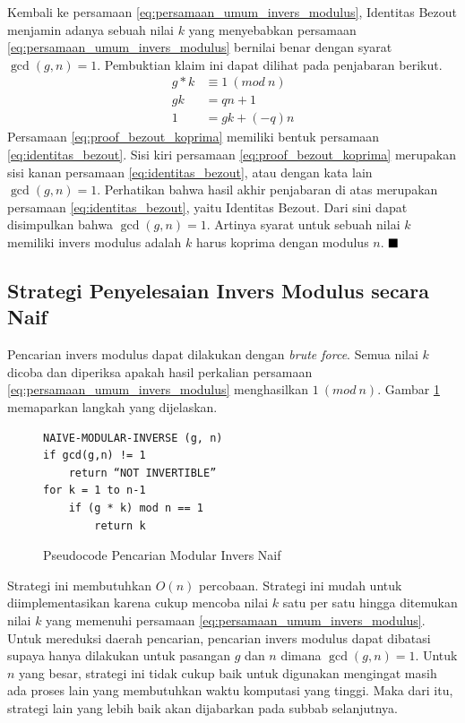 Kembali ke persamaan \eqref{eq:persamaan_umum_invers_modulus}, Identitas Bezout menjamin adanya sebuah nilai $ k $ yang menyebabkan persamaan \eqref{eq:persamaan_umum_invers_modulus} bernilai benar dengan syarat $ \gcd (g,n) = 1 $. Pembuktian klaim ini dapat dilihat pada penjabaran berikut.
\begin{align}
g*k &\equiv 1\ (mod\ n) \\
gk &= qn+1 \\
1 &= gk + (-q)n
\label{eq:proof_bezout_koprima}
\end{align}
Persamaan \eqref{eq:proof_bezout_koprima} memiliki bentuk persamaan \eqref{eq:identitas_bezout}. Sisi kiri persamaan \eqref{eq:proof_bezout_koprima} merupakan sisi kanan persamaan \eqref{eq:identitas_bezout}, atau dengan kata lain $ \gcd (g, n) = 1 $. Perhatikan bahwa hasil akhir penjabaran di atas merupakan persamaan \eqref{eq:identitas_bezout}, yaitu Identitas Bezout. Dari sini dapat disimpulkan bahwa $ \gcd (g, n)=1 $. Artinya syarat untuk sebuah nilai $ k $ memiliki invers modulus adalah $ k $ harus koprima dengan modulus $ n $. \hfill $ \blacksquare $

\subsection{Strategi Penyelesaian Invers Modulus secara Naif}

Pencarian invers modulus dapat dilakukan dengan \textit{brute force}. Semua nilai $ k $ dicoba dan diperiksa apakah hasil perkalian persamaan \eqref{eq:persamaan_umum_invers_modulus} menghasilkan $ 1\ (mod\ n) $. Gambar \ref{psdo:modinv_naive} memaparkan langkah yang dijelaskan.
\begin{figure}[h!]
\begin{lstlisting}[firstnumber=0]
NAIVE-MODULAR-INVERSE (g, n)
if gcd(g,n) != 1
	return “NOT INVERTIBLE”
for k = 1 to n-1
	if (g * k) mod n == 1
		return k
\end{lstlisting}
\caption{Pseudocode Pencarian Modular Invers Naif}
\label{psdo:modinv_naive}
\end{figure}

Strategi ini membutuhkan $ O(n) $ percobaan. Strategi ini mudah untuk diimplementasikan karena cukup mencoba nilai $ k $ satu per satu hingga ditemukan nilai $ k $ yang memenuhi persamaan \eqref{eq:persamaan_umum_invers_modulus}. Untuk mereduksi daerah pencarian, pencarian invers modulus dapat dibatasi supaya hanya dilakukan untuk pasangan $g$ dan $n$ dimana $ \gcd⁡(g,n)=1$. Untuk $ n $ yang besar, strategi ini tidak cukup baik untuk digunakan mengingat masih ada proses lain yang membutuhkan waktu komputasi yang tinggi. Maka dari itu, strategi lain yang lebih baik akan dijabarkan pada subbab selanjutnya.

